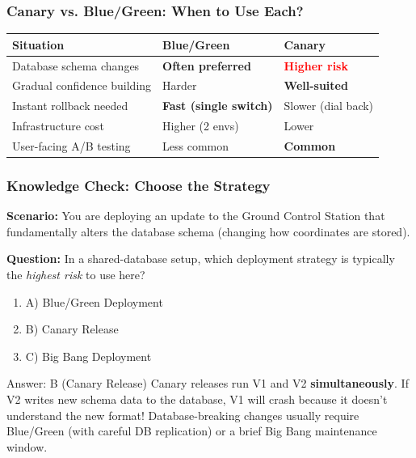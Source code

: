 \documentclass[xcolor=table]{beamer}
\begin{document}
\begin{frame}
    \frametitle{Canary vs. Blue/Green: When to Use Each?}
    \small
    \begin{center}
    \begin{tabular}{p{3.5cm} p{3cm} p{3cm}}
        \hline
        \rowcolor{gray!30}
        \textbf{Situation} & \textbf{Blue/Green} & \textbf{Canary} \\
        \hline
        \rowcolor{gray!15}
        Database schema changes & \textcolor{green!60!black}{\textbf{Often preferred}} & \textcolor{red}{\textbf{Higher risk}} \\
        Gradual confidence building & Harder & \textcolor{green!60!black}{\textbf{Well-suited}} \\
        \rowcolor{gray!15}
        Instant rollback needed & \textcolor{green!60!black}{\textbf{Fast (single switch)}} & Slower (dial back) \\
        Infrastructure cost & Higher (2 envs) & Lower \\
        \rowcolor{gray!15}
        User-facing A/B testing & Less common & \textcolor{green!60!black}{\textbf{Common}} \\
        \hline
    \end{tabular}
    \end{center}

\end{frame}

\begin{frame}
    \frametitle{Knowledge Check: Choose the Strategy}
    \textbf{Scenario:} You are deploying an update to the Ground Control Station that fundamentally alters the database schema (changing how coordinates are stored). 
    
    \vspace{0.2cm}
    \textbf{Question:} In a shared-database setup, which deployment strategy is typically the \textit{highest risk} to use here?
    \begin{enumerate}
        \item A) Blue/Green Deployment
        \item B) Canary Release
        \item C) Big Bang Deployment
    \end{enumerate}
    
    \pause
    \vspace{0.2cm}
    \begin{alertblock}{Answer: B (Canary Release)}
        Canary releases run V1 and V2 \textbf{simultaneously}. If V2 writes new schema data to the database, V1 will crash because it doesn't understand the new format! Database-breaking changes usually require Blue/Green (with careful DB replication) or a brief Big Bang maintenance window.
    \end{alertblock}
\end{frame}
\end{document}
